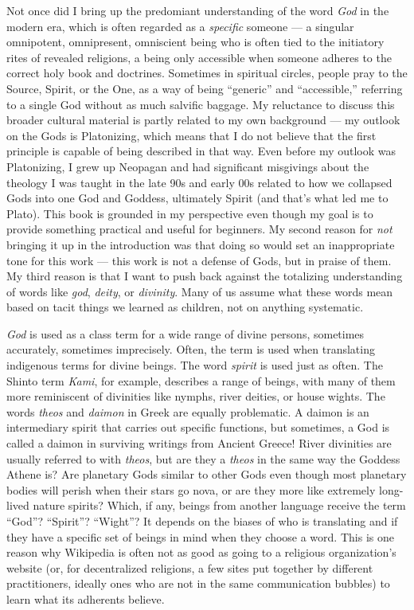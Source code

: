 \documentclass[
]{book}
\begin{document}
Not once did I bring up the predomiant understanding of the word \emph{God} in the modern era, which is often regarded as a \emph{specific} someone --- a singular omnipotent, omnipresent, omniscient being who is often tied to the initiatory rites of revealed religions, a being only accessible when someone adheres to the correct holy book and doctrines. Sometimes in spiritual circles, people pray to the Source, Spirit, or the One, as a way of being ``generic'' and ``accessible,'' referring to a single God without as much salvific baggage. My reluctance to discuss this broader cultural material is partly related to my own background --- my outlook on the Gods is Platonizing, which means that I do not believe that the first principle is capable of being described in that way. Even before my outlook was Platonizing, I grew up Neopagan and had significant misgivings about the theology I was taught in the late 90s and early 00s related to how we collapsed Gods into one God and Goddess, ultimately Spirit (and that's what led me to Plato). This book is grounded in my perspective even though my goal is to provide something practical and useful for beginners. My second reason for \emph{not} bringing it up in the introduction was that doing so would set an inappropriate tone for this work --- this work is not a defense of Gods, but in praise of them. My third reason is that I want to push back against the totalizing understanding of words like \emph{god}, \emph{deity}, or \emph{divinity}. Many of us assume what these words mean based on tacit things we learned as children, not on anything systematic.

\emph{God} is used as a class term for a wide range of divine persons, sometimes accurately, sometimes imprecisely. Often, the term is used when translating indigenous terms for divine beings. The word \emph{spirit} is used just as often. The Shinto term \emph{Kami}, for example, describes a range of beings, with many of them more reminiscent of divinities like nymphs, river deities, or house wights. The words \emph{theos} and \emph{daimon} in Greek are equally problematic. A daimon is an intermediary spirit that carries out specific functions, but sometimes, a God is called a daimon in surviving writings from Ancient Greece! River divinities are usually referred to with \emph{theos}, but are they a \emph{theos} in the same way the Goddess Athene is? Are planetary Gods similar to other Gods even though most planetary bodies will perish when their stars go nova, or are they more like extremely long-lived nature spirits? Which, if any, beings from another language receive the term ``God''? ``Spirit''? ``Wight''? It depends on the biases of who is translating and if they have a specific set of beings in mind when they choose a word. This is one reason why Wikipedia is often not as good as going to a religious organization's website (or, for decentralized religions, a few sites put together by different practitioners, ideally ones who are not in the same communication bubbles) to learn what its adherents believe.
\end{document}
